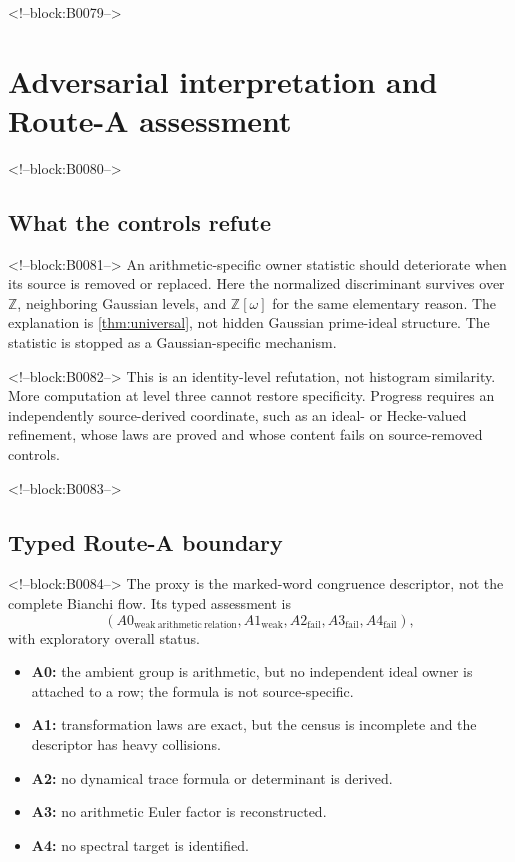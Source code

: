 \documentclass[11pt,a4paper]{article}
\theoremstyle{definition}
\theoremstyle{remark}
\newcommand{\Eis}{\mathbb{Z}[\omega]}
\begin{document}
<!--block:B0079-->
\section{Adversarial interpretation and Route-A assessment}

<!--block:B0080-->
\subsection{What the controls refute}

<!--block:B0081-->
An arithmetic-specific owner statistic should deteriorate when its source is removed or replaced. Here the normalized discriminant survives over \(\mathbb Z\), neighboring Gaussian levels, and \(\Eis\) for the same elementary reason. The explanation is \cref{thm:universal}, not hidden Gaussian prime-ideal structure. The statistic is stopped as a Gaussian-specific mechanism.

<!--block:B0082-->
This is an identity-level refutation, not histogram similarity. More computation at level three cannot restore specificity. Progress requires an independently source-derived coordinate, such as an ideal- or Hecke-valued refinement, whose laws are proved and whose content fails on source-removed controls.

<!--block:B0083-->
\subsection{Typed Route-A boundary}

<!--block:B0084-->
The proxy is the marked-word congruence descriptor, not the complete Bianchi flow. Its typed assessment is
\[
 (A0_{\mathrm{weak\ arithmetic\ relation}},
 A1_{\mathrm{weak}},A2_{\mathrm{fail}},A3_{\mathrm{fail}},A4_{\mathrm{fail}}),
\]
with exploratory overall status.
\begin{itemize}
 \item \textbf{A0:} the ambient group is arithmetic, but no independent ideal owner is attached to a row; the formula is not source-specific.
 \item \textbf{A1:} transformation laws are exact, but the census is incomplete and the descriptor has heavy collisions.
 \item \textbf{A2:} no dynamical trace formula or determinant is derived.
 \item \textbf{A3:} no arithmetic Euler factor is reconstructed.
 \item \textbf{A4:} no spectral target is identified.
\end{itemize}
\end{document}
